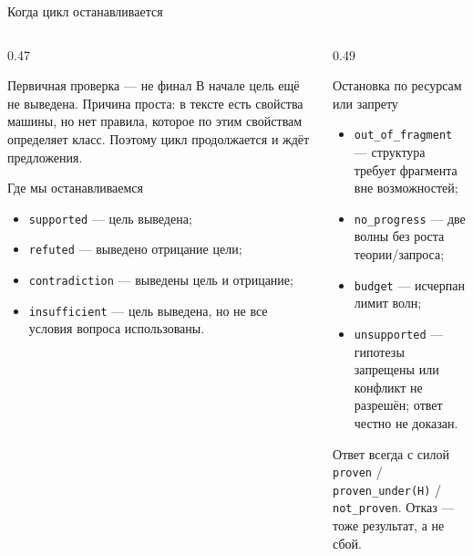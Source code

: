 \documentclass[aspectratio=169,11pt]{beamer}
\newcommand{\Hyp}[1]{\textcolor{hypocolor}{#1}}
\newcommand{\Rej}[1]{\textcolor{rejectcolor}{#1}}
\newcommand{\Prov}[1]{\textcolor{provencolor}{#1}}
\begin{document}
\begin{frame}[shrink=3]{Когда цикл останавливается}
  \footnotesize
  \begin{columns}[T,onlytextwidth]
    \begin{column}{0.47\textwidth}
      \begin{block}{Первичная проверка --- не финал}
        В начале цель ещё не выведена. Причина проста: в тексте есть
        свойства машины, но нет правила, которое по этим свойствам
        определяет класс. Поэтому цикл продолжается и ждёт предложения.
      \end{block}
      \begin{block}{Где мы останавливаемся}
        \begin{itemize}
          \item \Prov{\texttt{supported}} --- цель выведена;
          \item \Prov{\texttt{refuted}} --- выведено отрицание цели;
          \item \Rej{\texttt{contradiction}} --- выведены цель и отрицание;
          \item \texttt{insufficient} --- цель выведена, но не все условия
                вопроса использованы.
        \end{itemize}
      \end{block}
    \end{column}
    \begin{column}{0.49\textwidth}
      \begin{block}{Остановка по ресурсам или запрету}
        \begin{itemize}
          \item \Rej{\texttt{out\_of\_fragment}} --- структура требует
                фрагмента вне возможностей;
          \item \texttt{no\_progress} --- две волны без роста теории/запроса;
          \item \texttt{budget} --- исчерпан лимит волн;
          \item \texttt{unsupported} --- гипотезы запрещены или конфликт
                не разрешён; ответ честно не доказан.
        \end{itemize}
      \end{block}
      \begin{block}{Ответ всегда с силой}
        \Prov{\texttt{proven}} / \Hyp{\texttt{proven\_under(H)}} /
        \texttt{not\_proven}. Отказ --- тоже результат, а не сбой.
      \end{block}
    \end{column}
  \end{columns}
\end{frame}
\end{document}
